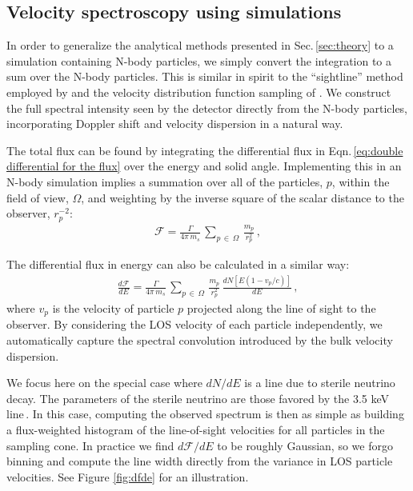 \documentclass[aps,prd,10pt,twocolumn,superscriptaddress,showpacs]{revtex4-1}
\begin{document}
\subsection{Velocity spectroscopy using simulations}
\label{sec:simulations}

In order to generalize the analytical methods presented in Sec.\,\ref{sec:theory} to a simulation
containing N-body particles, we simply convert the integration to a sum over the N-body particles.
This is similar in spirit to the ``sightline'' method employed by \cite{Lovell:2014lea} and the
velocity distribution function sampling of \cite{Mao:2012hf}.  We construct the full spectral
intensity seen by the detector directly from the N-body particles, incorporating Doppler shift and
velocity dispersion in a natural way.   


The total flux can be found by integrating the differential flux in Eqn.\,\ref{eq:double differential for the flux} over the energy and solid angle.  Implementing this in an N-body simulation implies a summation over all of the particles, $p$, within the field of view, $\Omega$, and weighting by the inverse square of the scalar distance to the observer, $r^{-2}_p$:
\begin{eqnarray} 
\mathcal{F} = \frac{\Gamma}{4\pi \, m_s} \, \sum_{p \, \in \, \Omega} \, \frac{m_p}{r_p^{2}} \, ,
\end{eqnarray}

The differential flux in energy can also be calculated in a similar way:
\begin{eqnarray}
\label{eq:discrete}
\frac{d\mathcal{F}}{dE} = \frac{\Gamma}{4 \pi \, m_s}\, \sum_{p \, \in \, \Omega} \, \frac{m_p}{r_p^{2}} \, \frac{dN[E(1-v_p/c)]}{dE} \, ,
\end{eqnarray}
where $v_p$ is the velocity of particle $p$ projected along the line of sight to the observer.  By
considering the LOS velocity of each particle independently, we automatically capture the spectral
convolution introduced by the bulk velocity dispersion. 

We focus here on the special case where $dN/dE$ is a line due to sterile neutrino decay.  The
parameters of the sterile neutrino are those favored by the 3.5 keV line\,\cite{Bulbul:2014sua}.  In
this case, computing the observed spectrum is then as simple as building a flux-weighted histogram
of the line-of-sight velocities for all particles in the sampling cone. In practice we find
$d\mathcal{F}/dE$ to be roughly Gaussian, so we forgo binning and compute the line width directly
from the variance in LOS particle velocities. See Figure \ref{fig:dfde} for an illustration. 
\end{document}
